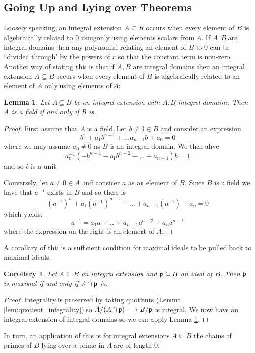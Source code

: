 \documentclass[12pt]{article}
\theoremstyle{plain}
\newtheorem{lemma}[thm]{Lemma}
\newtheorem{cor}[thm]{Corollary}
\theoremstyle{definition}
\newcommand{\lto}{\longrightarrow}
\begin{document}
\subsection{Going Up and Lying over Theorems}
Loosely speaking, an integral extension $A \subseteq B$ occurs when every element of $B$ is algebraically related to $0$ usingonly using elements scalars from $A$. If $A,B$ are integral domains then any polynomial relating an element of $B$ to $0$ can be ``divided through" by the powers of $x$ so that the constant term is non-zero. Another way of stating this is that if $A,B$ are integral domains then an integral extension $A \subseteq B$ occurs when every element of $B$ is algebraically related to an element of $A$ only using elements of $A$:
%
\begin{lemma}
\label{lem:integral_ext_fields}
Let $A \subseteq B$ be an integral extension with $A,B$ integral domains. Then $A$ is a field if and only if $B$ is.
\end{lemma}
\begin{proof}
First assume that $A$ is a field. Let $b \neq 0 \in B$ and consider an expression
\[b^n + a_1b^{n-1} + \hdots a_{n-1}b + a_0 = 0\]
where we may assume $a_0 \neq 0$ as $B$ is an integral domain. We then ahve
\[a_0^{-1}(-b^{n-1} - a_1b^{n-2} - \hdots - a_{n-1})b = 1\]
and so $b$ is a unit.

Conversely, let $a \neq 0\in A$ and consider $a$ as an element of $B$. Since $B$ is a field we have that $a^{-1}$ exists in $B$ and so there is
\[(a^{-1})^n + a_{1}(a^{-1})^{n-1} + \hdots + a_{n-1}(a^{-1}) + a_n = 0\]
which yields:
\[a^{-1} = a_1a + \hdots + a_{n-1}a^{n-2} + a_na^{n-1}\]
where the expression on the right is an element of $A$.
\end{proof}
A corollary of this is a sufficient condition for maximal ideals to be pulled back to maximal ideals:
\begin{cor}
\label{cor:maximality_preserved_integrality}
Let $A \subseteq B$ an integral extension and $\frak{p} \subseteq B$ an ideal of $B$. Then $\frak{p}$ is maximal if and only if $A \cap \frak{p}$ is.
\end{cor}
\begin{proof}
Integrality is preserved by taking quotients (Lemma \ref{lem:quotient_integrality}) so $A/(A \cap \frak{p}) \lto B/\frak{p}$ is integral. We now have an integral extension of integral domains so we can apply Lemma \ref{lem:integral_ext_fields}.
\end{proof}
In turn, an application of this is for integral extensions $A \subseteq B$ the chains of primes of $B$ lying over a prime in $A$ are of length $0$:
\end{document}
